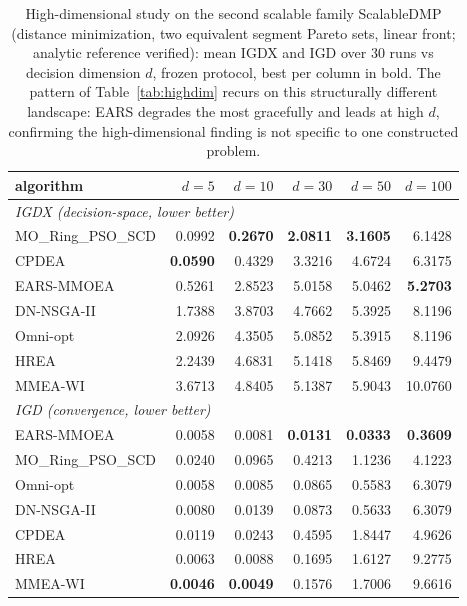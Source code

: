 \begin{table}[t]
\centering\small
\caption{High-dimensional study on the second scalable family ScalableDMP (distance minimization, two equivalent segment Pareto sets, linear front; analytic reference verified): mean IGDX and IGD over $30$ runs vs decision dimension $d$, frozen protocol, best per column in bold. The pattern of Table~\ref{tab:highdim} recurs on this structurally different landscape: EARS degrades the most gracefully and leads at high $d$, confirming the high-dimensional finding is not specific to one constructed problem.}
\label{tab:highdim_dmp}
\begin{tabular}{lrrrrr}
\toprule
algorithm & $d{=}5$ & $d{=}10$ & $d{=}30$ & $d{=}50$ & $d{=}100$ \\
\midrule
\multicolumn{6}{l}{\emph{IGDX (decision-space, lower better)}}\\
MO\_Ring\_PSO\_SCD & 0.0992 & \textbf{0.2670} & \textbf{2.0811} & \textbf{3.1605} & 6.1428 \\
CPDEA & \textbf{0.0590} & 0.4329 & 3.3216 & 4.6724 & 6.3175 \\
EARS-MMOEA & 0.5261 & 2.8523 & 5.0158 & 5.0462 & \textbf{5.2703} \\
DN-NSGA-II & 1.7388 & 3.8703 & 4.7662 & 5.3925 & 8.1196 \\
Omni-opt & 2.0926 & 4.3505 & 5.0852 & 5.3915 & 8.1196 \\
HREA & 2.2439 & 4.6831 & 5.1418 & 5.8469 & 9.4479 \\
MMEA-WI & 3.6713 & 4.8405 & 5.1387 & 5.9043 & 10.0760 \\
\midrule
\multicolumn{6}{l}{\emph{IGD (convergence, lower better)}}\\
EARS-MMOEA & 0.0058 & 0.0081 & \textbf{0.0131} & \textbf{0.0333} & \textbf{0.3609} \\
MO\_Ring\_PSO\_SCD & 0.0240 & 0.0965 & 0.4213 & 1.1236 & 4.1223 \\
Omni-opt & 0.0058 & 0.0085 & 0.0865 & 0.5583 & 6.3079 \\
DN-NSGA-II & 0.0080 & 0.0139 & 0.0873 & 0.5633 & 6.3079 \\
CPDEA & 0.0119 & 0.0243 & 0.4595 & 1.8447 & 4.9626 \\
HREA & 0.0063 & 0.0088 & 0.1695 & 1.6127 & 9.2775 \\
MMEA-WI & \textbf{0.0046} & \textbf{0.0049} & 0.1576 & 1.7006 & 9.6616 \\
\bottomrule
\end{tabular}
\end{table}

